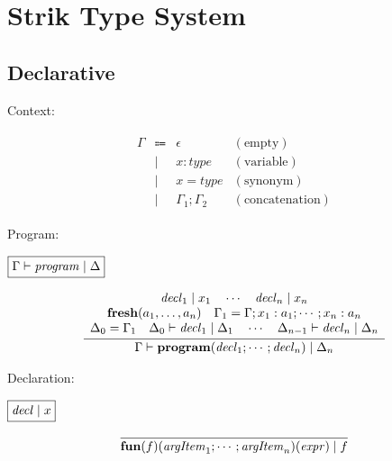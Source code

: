 \section{Strik Type System}

\subsection{Declarative}

Context:

\begin{align*}
  \begin{array}{rclr}
    \Gamma
    & \Coloneq & \epsilon &(\text{empty}) \\
    & \mid & x: \mathit{type} &(\text{variable}) \\
    & \mid & x = \mathit{type} &(\text{synonym}) \\
    & \mid & \Gamma_1; \Gamma_2 &(\text{concatenation})
  \end{array}
\end{align*}

Program:

$\fbox{$\Gamma \vdash \mathit{program} \mid \Delta$}$

\begin{gather*}
  \infer{\Gamma \vdash \mathbf{program}(\mathit{decl}_1; \cdots; \mathit{decl}_n) \mid \Delta_n}{
    \begin{array}{c}
      \mathit{decl}_1 \mid x_1
      \hspace{1em}
      \cdots
      \hspace{1em}
      \mathit{decl}_n \mid x_n
      \\
      \mathbf{fresh}(a_1, \ldots, a_n)
      \hspace{1em}
      \Gamma_1 = \Gamma; x_1: a_1; \cdots; x_n: a_n
      \\
      \Delta_0 = \Gamma_1
      \hspace{1em}
      \Delta_0 \vdash \mathit{decl}_1 \mid \Delta_1
      \hspace{1em}
      \cdots
      \hspace{1em}
      \Delta_{n - 1} \vdash \mathit{decl}_n \mid \Delta_n
    \end{array}
  }
\end{gather*}

Declaration:

$\fbox{$\mathit{decl} \mid x$}$

\begin{gather*}
  \infer{\mathbf{fun}(f)(\mathit{argItem}_1; \cdots; \mathit{argItem}_n)(\mathit{expr}) \mid f}{}
\end{gather*}

